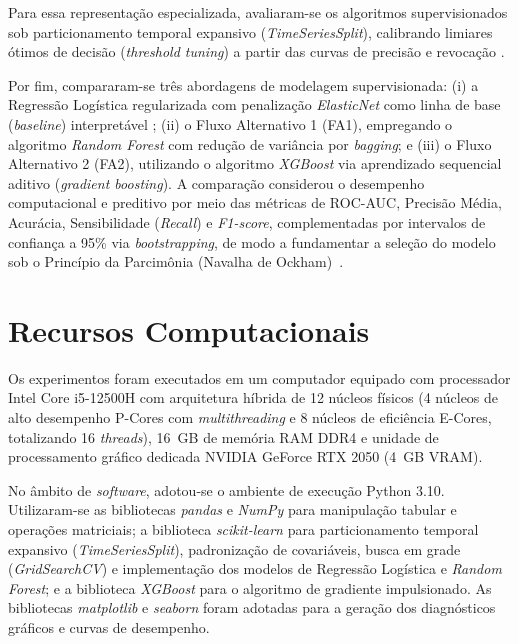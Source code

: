 \documentclass[conference]{IEEEtran}
\begin{document}
Para essa representação especializada, avaliaram-se os algoritmos supervisionados sob particionamento temporal expansivo (\textit{TimeSeriesSplit}), calibrando limiares ótimos de decisão (\textit{threshold tuning}) a partir das curvas de precisão e revocação \cite{izbicki2020}.

Por fim, compararam-se três abordagens de modelagem supervisionada: (i) a Regressão Logística regularizada com penalização \textit{ElasticNet} como linha de base (\textit{baseline}) interpretável \cite{zou2005, izbicki2020}; (ii) o Fluxo Alternativo 1 (FA1), empregando o algoritmo \textit{Random Forest} \cite{breiman2001} com redução de variância por \textit{bagging}; e (iii) o Fluxo Alternativo 2 (FA2), utilizando o algoritmo \textit{XGBoost} \cite{chen2016} via aprendizado sequencial aditivo (\textit{gradient boosting}). A comparação considerou o desempenho computacional e preditivo por meio das métricas de ROC-AUC, Precisão Média, Acurácia, Sensibilidade (\textit{Recall}) e \textit{F1-score}, complementadas por intervalos de confiança a 95\% via \textit{bootstrapping}, de modo a fundamentar a seleção do modelo sob o Princípio da Parcimônia (Navalha de Ockham)~\cite{izbicki2020}.

\section{Recursos Computacionais}
Os experimentos foram executados em um computador equipado com processador Intel Core i5-12500H com arquitetura híbrida de 12 núcleos físicos (4 núcleos de alto desempenho P-Cores com \textit{multithreading} e 8 núcleos de eficiência E-Cores, totalizando 16 \textit{threads}), 16~GB de memória RAM DDR4 e unidade de processamento gráfico dedicada NVIDIA GeForce RTX 2050 (4~GB VRAM).

No âmbito de \textit{software}, adotou-se o ambiente de execução Python 3.10. Utilizaram-se as bibliotecas \textit{pandas} e \textit{NumPy} para manipulação tabular e operações matriciais; a biblioteca \textit{scikit-learn} \cite{pedregosa2011} para particionamento temporal expansivo (\textit{TimeSeriesSplit}), padronização de covariáveis, busca em grade (\textit{GridSearchCV}) e implementação dos modelos de Regressão Logística e \textit{Random Forest}; e a biblioteca \textit{XGBoost} \cite{chen2016} para o algoritmo de gradiente impulsionado. As bibliotecas \textit{matplotlib} e \textit{seaborn} foram adotadas para a geração dos diagnósticos gráficos e curvas de desempenho.
\end{document}
